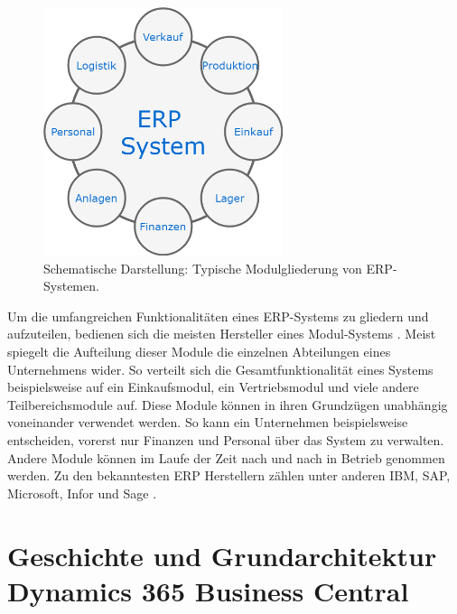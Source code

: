 \pagebreak

\begin{figure}[h]
	\centering
	\includegraphics[width=70mm]{images/ERPModules.png}
	\caption{Schematische Darstellung: Typische Modulgliederung von ERP-Systemen.}
	\label{fig:Modulisierung}
\end{figure}

Um die umfangreichen Funktionalitäten eines ERP-Systems zu gliedern und aufzuteilen, bedienen sich die meisten Hersteller eines Modul-Systems \cite{studebaker2007programming}. Meist spiegelt die Aufteilung dieser Module die einzelnen Abteilungen eines Unternehmens wider. So verteilt sich die Gesamtfunktionalität eines Systems beispielsweise auf ein Einkaufsmodul, ein Vertriebsmodul und viele andere Teilbereichsmodule auf. 
Diese Module können in ihren Grundzügen unabhängig voneinander verwendet werden. So kann ein Unternehmen beispielsweise entscheiden, vorerst nur Finanzen und Personal über das System zu verwalten. Andere Module können im Laufe der Zeit nach und nach in Betrieb genommen werden. Zu den bekanntesten ERP Herstellern zählen unter anderen IBM, SAP, Microsoft, Infor und Sage \cite{hoque2015}\cite{imcontrolling}.

\pagebreak
\section{Geschichte und Grundarchitektur Dynamics 365 Business Central}
\label{sec:Grundarchitektur Dynamics 365 Business Central}

